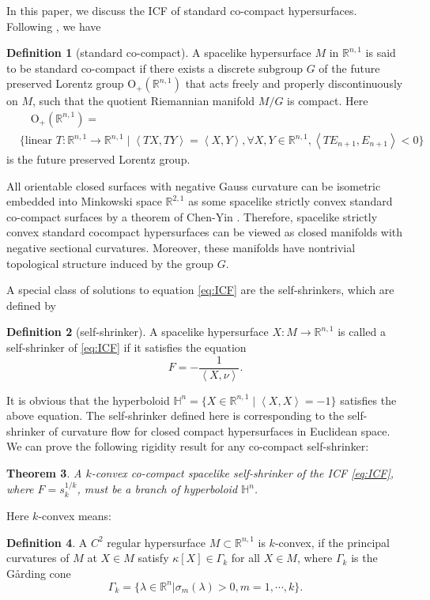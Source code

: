 \documentclass[reqno]{amsart}
\newtheorem{theorem}{Theorem}[section]
\theoremstyle{remark}
\newcommand{\R}{\ensuremath{\mathbb{R}}}
\renewcommand{\H}{{\mathbb{H}}}
\newcommand{\ip}[2]{\ensuremath{\left< {#1}, {#2} \right>}}
\theoremstyle{definition}
\newtheorem{definition}[theorem]{Definition}
\numberwithin{equation}{section}
\begin{document}
\par In this paper, we discuss the ICF of standard co-compact hypersurfaces. Following \cite{co-compact}, we have 
\begin{definition}[standard co-compact]\label{defn:std co-compact}
A spacelike hypersurface $M$ in $\mathbb{R}^{n,1}$ is said to be standard co-compact if there exists a discrete subgroup $G$ of the future preserved Lorentz group $\mathrm{O}_+(\mathbb{R}^{n,1})$ that acts freely and properly discontinuously on $M$, such that the quotient Riemannian manifold $M/G$ is compact. Here 
$$ \begin{aligned}
    &\quad \mathrm{O}_+(\mathbb{R}^{n,1}) = \\
    & \Big\{\text{linear } T:\R^{n,1}\to \R^{n,1} \mid \ip{TX}{TY} = \ip{X}{Y}, \forall X,Y\in \R^{n,1}, \ip{TE_{n+1}}{E_{n+1}} < 0 \Big\}
\end{aligned} $$
is the future preserved Lorentz group. 
\end{definition} 
 All orientable closed surfaces with negative Gauss curvature can be isometric embedded into Minkowski space $\mathbb{R}^{2,1}$ as some spacelike strictly convex standard co-compact surfaces by a theorem of Chen-Yin \cite{ChYin}. Therefore, spacelike strictly convex standard cocompact hypersurfaces can be viewed as closed manifolds with negative sectional curvatures. Moreover, these manifolds have nontrivial topological structure induced by the group $G$.              



\par A special class of solutions to equation \eqref{eq:ICF} are the self-shrinkers, which are defined by 
\begin{definition}[self-shrinker]
    A spacelike hypersurface \(X:M\to \R^{n,1}\) is called a self-shrinker of \eqref{eq:ICF} if it satisfies the equation 
    \begin{equation}\label{eq:self-shrinker}
        F = -\frac{1}{\ip{X}{\nu}}.
    \end{equation}
\end{definition}

It is obvious that the hyperboloid \(\H^n = \{X\in \R^{n,1}\mid \ip{X}{X} = -1\}\) satisfies the above equation. The self-shrinker defined here is corresponding to the self-shrinker of curvature flow for closed compact hypersurfaces in Euclidean space.  
We can prove the following rigidity result for any co-compact self-shrinker: 
\begin{theorem}\label{lem:rigidity}
    A $k$-convex co-compact spacelike self-shrinker of the ICF \eqref{eq:ICF}, where \(F = s_k^{1/k}\), must be a branch of hyperboloid \(\H^n\). 
\end{theorem}
 Here $k$-convex means: 
 \begin{definition}
\label{intdef1}
A $C^2$ regular hypersurface $M\subset \R^{n, 1}$ is $k$-convex,
if the principal curvatures of $M$ at $X\in M$ satisfy $\kappa[X]\in\Gamma_k$ for all $X\in M$, where $\Gamma_k$
is the G\r{a}rding cone
\[\Gamma_k=\{\lambda\in\R^n|\sigma_m(\lambda)>0, m=1, \cdots, k\}.\]
\end{definition} 
 
\end{document}
